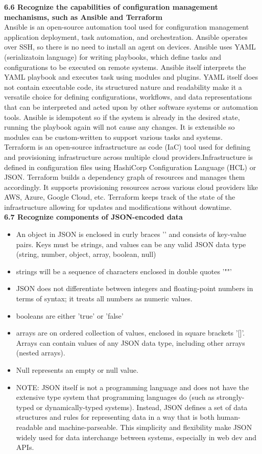 \documentclass{article}
\begin{document}
\textbf{6.6 Recognize the capabilities of configuration management mechanisms, such as Ansible and Terraform}\\

Ansible is an open-source automation tool used for configuration management application deployment, task automation, and orchestration. Ansible operates over SSH, so there is no need to install an agent on devices. Ansible uses YAML (serializatoin language) for writing playbooks, which define tasks and configurations to be executed on remote systems. Ansible itself interprets the YAML playbook and executes task using modules and plugins. YAML itself does not contain executable code, its structured nature and readability make it a versatile choice for defining configurations, workflows, and data representations that can be interpreted and acted upon by other software systems or automation tools. Ansible is idempotent so if the system is already in the desired state, running the playbook again will not cause any changes. It is extensible so modules can be custom-written to support various tasks and systems.\\

	Terraform is an open-source infrastructure as code (IaC) tool used for defining and provisioning infrastructure across multiple cloud providers.Infrastructure is defined in configuration files using HashiCorp Configuration Language (HCL) or JSON. Terraform builds a dependency graph of resources and manages them accordingly. It supports provisioning resources across various cloud providers like AWS, Azure, Google Cloud, etc. Terraform keeps track of the state of the infrastructure allowing for updates and modifications without downtime.\\
  
\textbf{6.7 Recognize components of JSON-encoded data}
\begin{itemize}
\item An object in JSON is enclosed in curly braces '{}' and consists of key-value pairs. Keys must be strings, and values can be any valid JSON data type (string, number, object, array, boolean, null)
\item strings will be a sequence of characters enclosed in double quotes '""'
\item JSON does not differentiate between integers and floating-point numbers in terms of syntax; it treats all numbers as numeric values.
\item booleans are either 'true' or 'false' 	
\item arrays are on ordered collection of values, enclosed in square brackets '[]'. Arrays can contain values of any JSON data type, including other arrays (nested arrays).
\item Null represents an empty or null value.
\item NOTE: JSON itself is not a programming language and does not have the extensive type system that programming languages do (such as strongly-typed or dynamically-typed systems). Instead, JSON defines a set of data structures and rules for representing data in a way that is both human-readable and machine-parseable. This simplicity and flexibility make JSON widely used for data interchange between systems, especially in web dev and APIs.
\end{itemize}
\end{document}
